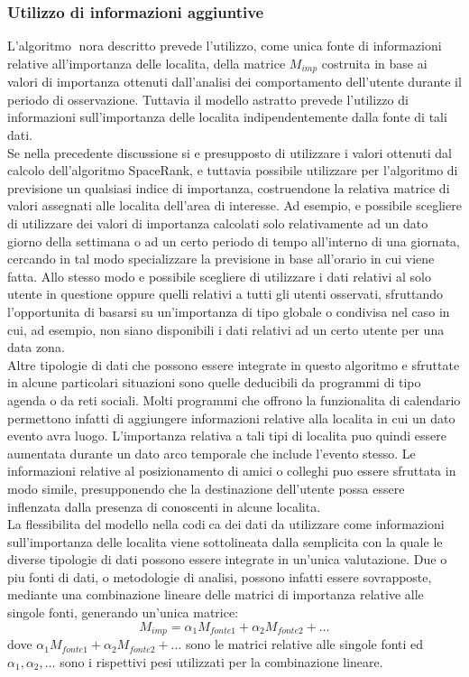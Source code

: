 \subsubsection{Utilizzo di informazioni aggiuntive}
L'algoritmo nora descritto prevede l'utilizzo, come unica fonte di informazioni
relative all'importanza delle localita, della matrice $M_{imp}$ costruita in base ai
valori di importanza ottenuti dall'analisi dei comportamento dell'utente durante
il periodo di osservazione. Tuttavia il modello astratto prevede l'utilizzo
di informazioni sull'importanza delle localita indipendentemente dalla fonte di
tali dati.\\
Se nella precedente discussione si e presupposto di utilizzare i valori ottenuti
dal calcolo dell'algoritmo SpaceRank, e tuttavia possibile utilizzare per
l'algoritmo di previsione un qualsiasi indice di importanza, costruendone la
relativa matrice di valori assegnati alle localita dell'area di interesse. Ad esempio,
e possibile scegliere di utilizzare dei valori di importanza calcolati solo
relativamente ad un dato giorno della settimana o ad un certo periodo di tempo
all'interno di una giornata, cercando in tal modo specializzare la previsione
in base all'orario in cui viene fatta. Allo stesso modo e possibile scegliere di
utilizzare i dati relativi al solo utente in questione oppure quelli relativi a tutti
gli utenti osservati, sfruttando l'opportunita di basarsi su un'importanza di
tipo globale o condivisa nel caso in cui, ad esempio, non siano disponibili i
dati relativi ad un certo utente per una data zona.\\
Altre tipologie di dati che possono essere integrate in questo algoritmo e
sfruttate in alcune particolari situazioni sono quelle deducibili da programmi
di tipo agenda o da reti sociali. Molti programmi che offrono la funzionalita di
calendario permettono infatti di aggiungere informazioni relative alla localita in
cui un dato evento avra luogo. L'importanza relativa a tali tipi di localita puo
quindi essere aumentata durante un dato arco temporale che include l'evento
stesso. Le informazioni relative al posizionamento di amici o colleghi puo essere
sfruttata in modo simile, presupponendo che la destinazione dell'utente possa
essere inflenzata dalla presenza di conoscenti in alcune localita.\\
La flessibilita del modello nella codica dei dati da utilizzare come informazioni
sull'importanza delle localita viene sottolineata dalla semplicita con
la quale le diverse tipologie di dati possono essere integrate in un'unica valutazione.
Due o piu fonti di dati, o metodologie di analisi, possono infatti essere
sovrapposte, mediante una combinazione lineare delle matrici di importanza
relative alle singole fonti, generando un'unica matrice:
\begin{equation}
M_{imp} = \alpha_{1}M_{fonte1} + \alpha_{2}M_{fonte2} + \dots
\end{equation}
dove $\alpha_{1}M_{fonte1} + \alpha_{2}M_{fonte2} + \dots$ sono le matrici relative
alle singole fonti ed $\alpha_{1},\alpha_{2},\dots$
sono i rispettivi pesi utilizzati per la combinazione lineare.
